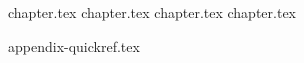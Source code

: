 \documentclass[11pt,a4paper,twoside,openright]{book}
\begin{document}
\frontmatter


\cleardoublepage
\tableofcontents
\cleardoublepage

\mainmatter

{chapter.tex}
{chapter.tex}
{chapter.tex}
{chapter.tex}

\appendix
{appendix-quickref.tex}
\end{document}
